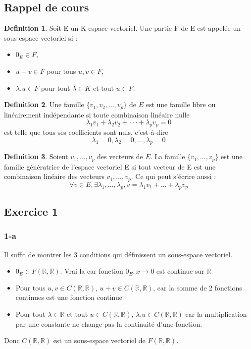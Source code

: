 \documentclass[]{book}
\theoremstyle{definition}
\newtheorem{defn}{Definition}
\newcommand{\bb}[1]{\mathbb{#1}}
\newcommand{\R}{\bb{R}}
\begin{document}
\subsection*{Rappel de cours}

\begin{defn}
Soit E un K-espace vectoriel. Une partie F de E est appelée un sous-espace vectoriel si :
\begin{itemize}
\item $0_E \in F$,
\item $u + v \in F$ pour tous $u, v \in F$,
\item $\lambda.u \in F$ pour tout $\lambda \in K$ et tout $u \in F$.
\end{itemize}
\end{defn}


\begin{defn}
Une famille $\{v_1, v_2, \ldots , v_p\}$ de $E$ est une famille libre ou lin\'eairement ind\'ependante si toute combinaison lin\'eaire nulle
$$\lambda_1v_1 + \lambda_2v_2 + ··· + \lambda_p v_p = 0$$
est telle que tous ses coefficients sont nuls, c’est-\`a-dire
$$\lambda_1 = 0, \lambda_2 = 0, \ldots, \lambda_p = 0$$
\end{defn}



\begin{defn}
Soient $v_1, \ldots, v_p$ des vecteurs de $E$. La famille $\{v_1, \ldots, v_p\}$ est une famille g\'en\'eratrice de l'espace vectoriel E si tout vecteur de E est une combinaison lin\'eaire des vecteurs $v_1, \ldots, v_p$. Ce qui peut s'\'ecrire aussi :
$$\forall v \in E, \exists \lambda_1, \ldots, \lambda_p, v = \lambda_1 v_1 + \ldots + \lambda_p v_p$$
\end{defn}


\newpage
\subsection*{Exercice 1}
\subsubsection*{1-a}

Il suffit de montrer les 3 conditions qui d\'efinissent un sous-espace vectoriel.
\begin{itemize}
\item $0_E \in F(\R,\R)$. Vrai la car fonction $0_E:x\to 0$ est continue sur $\R$
\item Pour tous $u, v \in C(\R,\R)$, $u + v \in C(\R,\R)$, car la somme de 2 fonctions continues est une fonction continue 
\item Pour tout $\lambda \in \R$ et tout $u \in C(\R,\R)$, $\lambda.u \in C(\R,\R)$ car la multiplication par une constante ne change pas la continuit\'e d'une fonction.
\end{itemize}
Donc $C(\R,\R)$ est un sous-espace vectoriel de $F(\R,\R)$.
\end{document}
